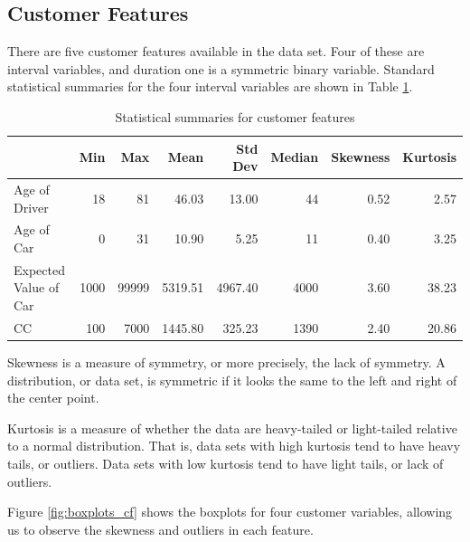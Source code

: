 \subsection{Customer Features}
\label{customer-features}

There are five customer features available in the data set. Four of these are interval variables, and duration one is a symmetric binary variable. Standard statistical summaries for the four interval variables are shown in Table \ref{tab:cf_summaries}.

\begin{table}[h]
\begin{center}
 \begin{tabular}{lrrrrrrr}
& Min & Max & Mean & Std Dev & Median &
Skewness & Kurtosis \\
\hline
Age of Driver & 18 & 81 & 46.03 & 13.00 & 44 & 0.52 & 2.57 \\
Age of Car & 0 & 31 & 10.90 & 5.25 & 11 & 0.40 & 3.25 \\
Expected Value of Car & 1000 & 99999 & 5319.51 & 4967.40 & 4000 & 3.60 & 38.23 \\
CC & 100 & 7000 & 1445.80 & 325.23 & 1390 & 2.40 & 20.86\\
\end{tabular}
\caption{Statistical summaries for customer features}
\label{tab:cf_summaries}
\end{center}
\end{table}

Skewness is a measure of symmetry, or more precisely, the lack of symmetry. A distribution, or data set, is symmetric if it looks the same to the left and right of the center point.

Kurtosis is a measure of whether the data are heavy-tailed or light-tailed relative to a normal distribution. That is, data sets with high kurtosis tend to have heavy tails, or outliers. Data sets with low kurtosis tend to have light tails, or lack of outliers. 

Figure \ref{fig:boxplots_cf} shows the boxplots for four customer variables, allowing us to observe  the skewness and outliers in each feature.

